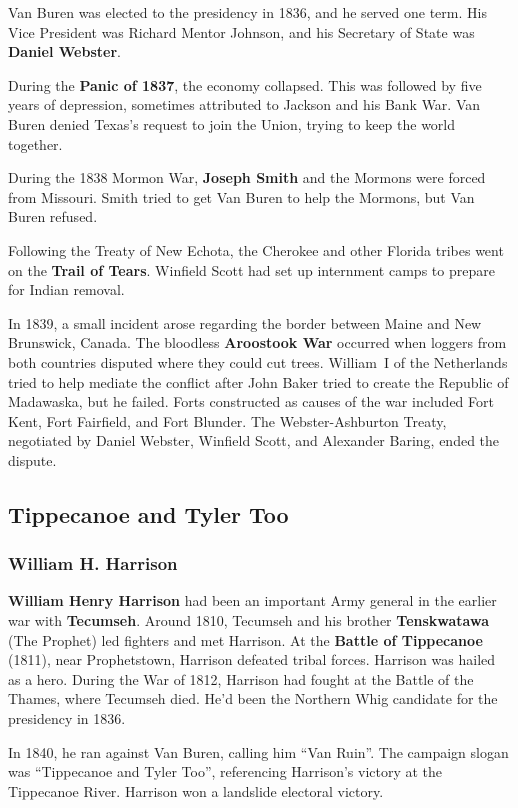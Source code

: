 Van Buren was elected to the presidency in 1836, and he served one term.
His Vice President was Richard Mentor Johnson,
and his Secretary of State was \textbf{Daniel Webster}.

During the \textbf{Panic of 1837}, the economy collapsed.
This was followed by five years of depression, sometimes attributed to Jackson and his Bank War.
Van Buren denied Texas's request to join the Union, trying to keep the world together.

During the 1838 Mormon War, \textbf{Joseph Smith} and the Mormons were forced from Missouri.
Smith tried to get Van Buren to help the Mormons, but Van Buren refused.

Following the Treaty of New Echota,
the Cherokee and other Florida tribes went on the \textbf{Trail of Tears}.
Winfield Scott had set up internment camps to prepare for Indian removal.

In 1839, a small incident arose regarding the border between Maine and New Brunswick, Canada.
The bloodless \textbf{Aroostook War} occurred when loggers from both countries disputed where they could cut trees.
William~I of the Netherlands tried to help mediate the conflict
after John Baker tried to create the Republic of Madawaska, but he failed.
Forts constructed as causes of the war included Fort Kent, Fort Fairfield, and Fort Blunder.
The Webster-Ashburton Treaty,
negotiated by Daniel Webster, Winfield Scott, and Alexander Baring,
ended the dispute.

\subsection*{Tippecanoe and Tyler Too}

\subsubsection*{William H. Harrison}

\textbf{William Henry Harrison} had been an important Army general in the earlier war with \textbf{Tecumseh}.
Around 1810, Tecumseh and his brother \textbf{Tenskwatawa} (The Prophet) led fighters and met Harrison.
At the \textbf{Battle of Tippecanoe} (1811), near Prophetstown, Harrison defeated tribal forces.
Harrison was hailed as a hero.
During the War of 1812, Harrison had fought at the Battle of the Thames, where Tecumseh died.
He'd been the Northern Whig candidate for the presidency in 1836.

In 1840, he ran against Van Buren, calling him ``Van Ruin''.
The campaign slogan was ``Tippecanoe and Tyler Too'', referencing Harrison's victory at the Tippecanoe River.
Harrison won a landslide electoral victory.

